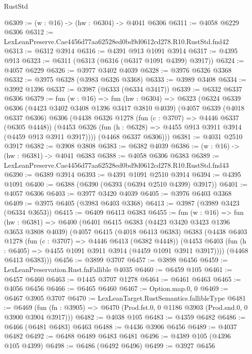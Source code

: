 \begin{lexlean}{RustStd}
\begin{coremodule}
@6309 := (w : @16) -> (hw : @6304) -> @4041 @6306
@6311 := @4058 @6229 @6306
@6312 := LexLeanPreserve.Cae4456d77aa62528ed0bd9d0612cd278.R10.RustStd.fnd42
@6313 := @6312 @3914
@6316 := @4391 @913 @1091 @3914
@6317 := @4395 @913
@6323 := @6311 (@6313 (@6316 (@6317 @1091 @4399) @3917))
@6324 := @4057 @6229
@6326 := @3977 @3402 @4039
@6328 := @3976 @6326 @3368
@6332 := @3975 @6328 (@3983 @6326 @3368)
@6333 := @3989 @3408
@6334 := @3992 @1396
@6337 := @3987 (@6333 (@6334 @3417))
@6339 := @6332 @6337 @6306
@6379 := fun (w : @16) =>
  fun (hw : @6304) =>
  @6323
    (@6324
      @6339
      @6306
      (@4423 @3402 @3408 @1396 @3417 @3810 @4039)
      (@4057
        @6339
        (@4018 @6337 @6306)
        @6306
        (@4438
          @6326
          @1278
          (fun (c : @3707) => @4446 @6337 (@6305 @4448))
          (@4453 @6326 (fun (h : @6328) => @4455 @913 @3911 @3914 (@4459 @913 @3911 @3917))))
        (@4468 @6337 @6306)))
@6381 := @4031 @2510 @3917
@6382 := @3908 @3808
@6383 := @6382 @4039
@6386 := (w : @16) -> (hw : @6381) -> @4041 @6383
@6388 := @4058 @6306 @6383
@6389 := LexLeanPreserve.Cae4456d77aa62528ed0bd9d0612cd278.R10.RustStd.fnd43
@6390 := @6389 @3914
@6393 := @4391 @1091 @2510 @3914
@6394 := @4395 @1091
@6400 := @6388 (@6390 (@6393 (@6394 @2510 @4399) @3917))
@6401 := @4057 @6306
@6403 := @3977 @3420 @4039
@6405 := @3976 @6403 @3368
@6409 := @3975 @6405 (@3983 @6403 @3368)
@6413 := @3987 (@3989 @3423 (@6334 @3653))
@6415 := @6409 @6413 @6383
@6455 := fun (w : @16) =>
  fun (hw : @6381) =>
  @6400
    (@6401
      @6415
      @6383
      (@4423 @3420 @3423 @1396 @3653 @3808 @4039)
      (@4057
        @6415
        (@4018 @6413 @6383)
        @6383
        (@4438
          @6403
          @1278
          (fun (c : @3707) => @4446 @6413 (@6382 @4448))
          (@4453 @6403 (fun (h : @6405) => @4455 @1091 @3911 @3914 (@4459 @1091 @3911 @3917))))
        (@4468 @6413 @6383)))
@6456 := @3899 @3707
@6457 := @3898 @6456
@6459 := LexLeanPreservation.Rust.fnFallible @4035
@6460 := @6459 @105
@6461 := @6457 @6460
@6463 := @1445 @3707 @1278
@6464 := @6461 @6463
@6465 := @4056 @6456
@6466 := @6465 @6460
@6467 := Option.map.{0, 0}
@6469 := @6467 @3905 @3707
@6470 := LexLeanTarget.RustSemantics.fallibleType
@6481 := @6469
    (fun (fn : @3905) => @6470 (Prod.fst.{0, 0} @1186 @3903 (Prod.snd.{0, 0} @3900 @3904 @3917)))
@6482 := @4038 @105
@6483 := @4359 @6482
@6486 := @6466 (@6481 @6483) @6463
@6488 := @4436 @3906 @6456
@6489 := @4037 @6482
@6492 := @6488 @6489 @6483 @6481
@6496 := @4389 @105 (@4396 @105 @4399)
@6498 := @6486 (@6492 @6496)
@6499 := @3927 @6456

\end{coremodule}
\end{lexlean}
